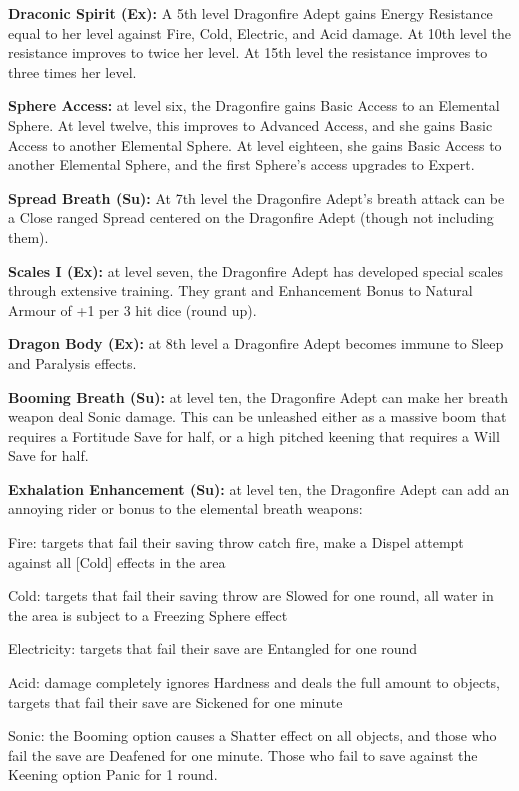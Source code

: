 \textbf{Draconic Spirit (Ex):} A 5th level Dragonfire Adept gains Energy Resistance equal to her level against Fire, Cold, Electric, and Acid damage. At 10th level the resistance improves to twice her level. At 15th level the resistance improves to three times her level.

\textbf{Sphere Access:} at level six, the Dragonfire gains Basic Access to an Elemental Sphere. At level twelve, this improves to Advanced Access, and she gains Basic Access to another Elemental Sphere. At level eighteen, she gains Basic Access to another Elemental Sphere, and the first Sphere's access upgrades to Expert.

\textbf{Spread Breath (Su):} At 7th level the Dragonfire Adept's breath attack can be a Close ranged Spread centered on the Dragonfire Adept (though not including them).

\textbf{Scales I (Ex):} at level seven, the Dragonfire Adept has developed special scales through extensive training. They grant and Enhancement Bonus to Natural Armour of +1 per 3 hit dice (round up).

\textbf{Dragon Body (Ex):} at 8th level a Dragonfire Adept becomes immune to Sleep and Paralysis effects.

\textbf{Booming Breath (Su):} at level ten, the Dragonfire Adept can make her breath weapon deal Sonic damage. This can be unleashed either as a massive boom that requires a Fortitude Save for half, or a high pitched keening that requires a Will Save for half.

\textbf{Exhalation Enhancement (Su):} at level ten, the Dragonfire Adept can add an annoying rider or bonus to the elemental breath weapons:

\begin{itemize*}
\item Fire: targets that fail their saving throw catch fire, make a Dispel attempt against all [Cold] effects in the area
\item Cold: targets that fail their saving throw are Slowed for one round, all water in the area is subject to a Freezing Sphere effect
\item Electricity: targets that fail their save are Entangled for one round
\item Acid: damage completely ignores Hardness and deals the full amount to objects, targets that fail their save are Sickened for one minute
\item Sonic: the Booming option causes a Shatter effect on all objects, and those who fail the save are Deafened for one minute. Those who fail to save against the Keening option Panic for 1 round.
\end{itemize*}

